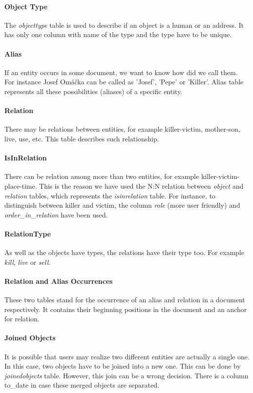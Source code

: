 \paragraph{Object Type} The \emph{objecttype} table is used to describe if an object is a human or an address. 
It has only one column with name of the type and the type have to be unique.

\paragraph{Alias} If an entity occurs in some document, we want to 
know how did we call them. For instance Josef Omáčka can be called as 'Josef', 
'Pepe' or 'Killer'. Alias table represents all these possibilities (aliases) 
of a specific entity.

\paragraph{Relation} There may be relations between entities, for example killer-victim,
mother-son, live, use, etc. This table describes such relationship. 

\paragraph{IsInRelation} There can be relation among more than two entities, for example 
killer-victim-place-time. This is the reason we have used the N:N relation 
between \emph{object} and \emph{relation} tables, which represents the \emph{isinrelation} 
table. For instance, to distinguish between killer and victim, the column \emph{role} 
(more user friendly) and \emph{order\_{}in\_{}relation} have been used.

\paragraph{RelationType} As well as the objects have types, the relations have their type too. 
For example \emph{kill}, \emph{live} or \emph{sell}.

\paragraph{Relation and Alias Occurrences} These two tables stand for the occurrence of an 
alias and relation in a document respectively. It contains their beginning positions in the document 
and an anchor for relation. 

\paragraph{Joined Objects} It is possible that users may realize two different entities are actually 
a single one. In this case, two objects have to be joined into a new one. This can be done by 
\emph{joinedobjects} table. However, this join can be a wrong decision. There is a column 
to\_{}date in case these merged objects are separated.

